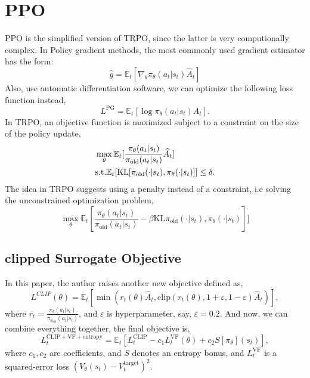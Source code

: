 \documentclass[11pt,a4paper]{article}
\def\hat{\widehat}
\def\epsilon{\varepsilon}
\def\E{\mathbb{E}}
\begin{document}
\section{PPO}
PPO\cite{schulman2017proximal} is the simplified version of TRPO, since the latter is very computionally complex. In Policy gradient methods, the most commonly used gradient estimator has the form:
\begin{equation}
\hat{g} = \E_t[\nabla_{\theta}\pi_{\theta}(a_t|s_t)\hat{A}_t]
\end{equation}
Also, use automatic differentiation software, we can optimize the following loss function instead,
\begin{equation}
    L^{\mathrm{PG}} = \E_t[\log\pi_{\theta}(a_t|s_t)A_t].
\end{equation}
In TRPO, an objective function is maximized subject to a constraint on the size of the policy update,
\begin{equation}
\aligned 
    & \max_{\theta} \E_t[\frac{\pi_{\theta}(a_t|s_t)}{\pi_{\mathrm{old}}(a_t|s_t)}\hat{A}_t] \\ 
    & \mathrm{s.t.} \E_t[\mathrm{KL}[\pi_{\mathrm{old}}(\cdot|s_t),\pi_{\theta}(\cdot|s_t)]] \le \delta.
\endaligned 
\end{equation}
The idea in TRPO suggests using a penalty instead of a constraint, i.e solving the unconstrained optimization problem,
\begin{equation}
    \max_{\theta} \E_t[\frac{\pi_{\theta}(a_t|s_t)}{\pi_{\mathrm{old}}(a_t|s_t)} -\beta \mathrm{KL}\pi_{\mathrm{old}}(\cdot|s_t),\pi_{\theta}(\cdot|s_t)]]
\end{equation}

\subsection{clipped Surrogate Objective}
In this paper, the author raises another new objective defined as,
\begin{equation}
L^{CLIP}(\theta) = \E_t[\min(r_t(\theta)\hat{A}_t, \mathrm{clip}(r_t(\theta),1+\epsilon,1-\epsilon)\hat{A}_t)],
\end{equation}
where $r_t = \frac{\pi_{\theta}(a_t|s_t)}{\pi_{\theta_{\mathrm{old}}}(a_t|s_t)}$, and $\epsilon$ is hyperparameter, say, $\epsilon=0.2$.
And now, we can combine everything together, the final objective is,
\begin{equation}
L_{t}^{\mathrm{CLIP}+\mathrm{VF}+\mathrm{entropy}} = \E_t[L_t^{\mathrm{CLIP}}-c_1L_t^{\mathrm{VF}}(\theta)+c_2S[\pi_{\theta}](s_t)],
\end{equation}
where $c_1,c_2$ are coefficients, and $S$ denotes an entropy bonus, and $L_t^{\mathrm{VF}}$ is a squared-error loss $(V_{\theta}(s_t) - V_t^{\mathrm{target}})^2$.
\end{document}
